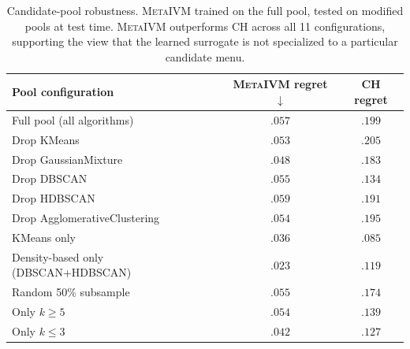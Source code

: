 \documentclass[10pt]{article} %
\newcommand{\ours}{\textsc{MetaIVM}}
\begin{document}
\begin{table}[h]
\centering
\caption{Candidate-pool robustness. \ours{} trained on the full pool, tested on modified pools at test time. \ours{} outperforms CH across all 11 configurations, supporting the view that the learned surrogate is not specialized to a particular candidate menu.}
\label{tab:pool_robust}
\small
\begin{tabular}{lcc}
\toprule
\textbf{Pool configuration} & \textbf{\ours{} regret} $\downarrow$ & \textbf{CH regret} \\
\midrule
Full pool (all algorithms) & $.057$ & $.199$ \\
\midrule
Drop KMeans & $.053$ & $.205$ \\
Drop GaussianMixture & $.048$ & $.183$ \\
Drop DBSCAN & $.055$ & $.134$ \\
Drop HDBSCAN & $.059$ & $.191$ \\
Drop AgglomerativeClustering & $.054$ & $.195$ \\
\midrule
KMeans only & $.036$ & $.085$ \\
Density-based only (DBSCAN+HDBSCAN) & $.023$ & $.119$ \\
Random 50\% subsample & $.055$ & $.174$ \\
Only $k \geq 5$ & $.054$ & $.139$ \\
Only $k \leq 3$ & $.042$ & $.127$ \\
\bottomrule
\end{tabular}
\end{table}
\end{document}
